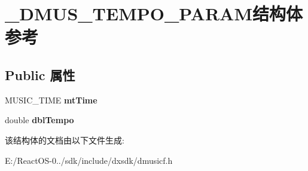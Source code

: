 \hypertarget{struct___d_m_u_s___t_e_m_p_o___p_a_r_a_m}{}\section{\+\_\+\+D\+M\+U\+S\+\_\+\+T\+E\+M\+P\+O\+\_\+\+P\+A\+R\+A\+M结构体 参考}
\label{struct___d_m_u_s___t_e_m_p_o___p_a_r_a_m}
\subsection*{Public 属性}
\begin{DoxyCompactItemize}
\item 
\mbox{\label{struct___d_m_u_s___t_e_m_p_o___p_a_r_a_m_a0c8f25b47ccf687f7d644ed14b03e13b}} 
M\+U\+S\+I\+C\+\_\+\+T\+I\+ME {\bfseries mt\+Time}
\item 
\mbox{\label{struct___d_m_u_s___t_e_m_p_o___p_a_r_a_m_a0068a33429709ec49bef3475d6a8e3b0}} 
double {\bfseries dbl\+Tempo}
\end{DoxyCompactItemize}


该结构体的文档由以下文件生成\+:\begin{DoxyCompactItemize}
\item 
E\+:/\+React\+O\+S-\/0../sdk/include/dxsdk/dmusicf.\+h\end{DoxyCompactItemize}
